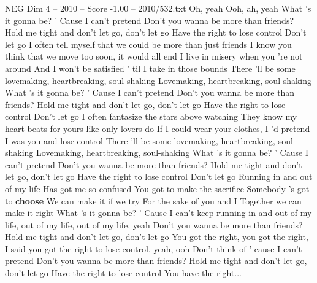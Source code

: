 \begin{textsample}{NEG Dim 4 – 2010 – Score -1.00 – 2010/532.txt}  \label{ex:f4_neg_012}
Oh, yeah Ooh, ah, yeah What 's it gonna be? ' Cause I can't pretend Don't you wanna be more than friends?
Hold me tight and don't let go, don't let go Have the right to lose control Don't let go I often tell myself that we could be more than just friends I know you think that we move too soon, it would all end I live in misery when you 're not around And I won't be satisfied ' til I take in those bounds There 'll be some lovemaking, heartbreaking, soul-shaking Lovemaking, heartbreaking, soul-shaking What 's it gonna be? ' Cause I can't pretend Don't you wanna be more than friends?
Hold me tight and don't let go, don't let go Have the right to lose control Don't let go I often fantasize the stars above watching They know my heart beats for yours like only lovers do If I could wear your clothes, I 'd pretend I was you and lose control There 'll be some lovemaking, heartbreaking, soul-shaking Lovemaking, heartbreaking, soul-shaking What 's it gonna be? ' Cause I can't pretend Don't you wanna be more than friends?
Hold me tight and don't let go, don't let go Have the right to lose control Don't let go Running in and out of my life Has got me so confused You got to make the sacrifice Somebody 's got to \textbf{choose} We can make it if we try For the sake of you and I Together we can make it right What 's it gonna be? ' Cause I can't keep running in and out of my life, out of my life, out of my life, yeah Don't you wanna be more than friends?
Hold me tight and don't let go, don't let go You got the right, you got the right, I said you got the right to lose control, yeah, ooh Don't think of ' cause I can't pretend Don't you wanna be more than friends?
Hold me tight and don't let go, don't let go Have the right to lose control You have the right...

\end{textsample}
